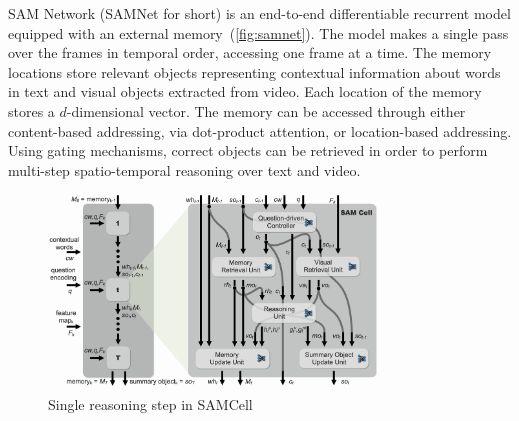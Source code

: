 
SAM Network (SAMNet for short) is an end-to-end differentiable recurrent model equipped with an external memory~(\cref{fig:samnet}).
The model makes a single pass over the frames in temporal order, accessing one frame at a time.
The memory locations store relevant objects representing contextual information about words in text and visual objects extracted from video. 
Each location of the memory stores a $d$-dimensional vector. %
The memory can be accessed through either content-based addressing, via dot-product attention, or location-based addressing. 
Using gating mechanisms, correct objects can be retrieved 
in order to perform multi-step spatio-temporal reasoning over text and video.  


\begin{figure}
	\centering
	\includegraphics[width=0.78\textwidth]{../img/architecture/samcell_reasoning}
	\caption{Single reasoning step in SAMCell}
	\label{fig:samcell}
\end{figure}


